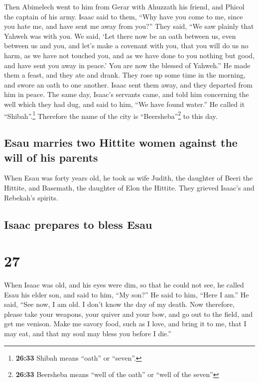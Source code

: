  Then Abimelech went to him from Gerar with Ahuzzath his
friend, and Phicol the captain of his army.  Isaac said
to them, ``Why have you come to me, since you hate me, and have sent me
away from you?''  They said, ``We saw plainly that Yahweh
was with you. We said, `Let there now be an oath between us, even
between us and you, and let's make a covenant with you, 
that you will do us no harm, as we have not touched you, and as we have
done to you nothing but good, and have sent you away in peace.' You are
now the blessed of Yahweh.''  He made them a feast, and
they ate and drank.  They rose up some time in the
morning, and swore an oath to one another. Isaac sent them away, and
they departed from him in peace.  The same day, Isaac's
servants came, and told him concerning the well which they had dug, and
said to him, ``We have found water.''  He called it
``Shibah''.\footnote{\textbf{26:33} Shibah means ``oath'' or ``seven''.}
Therefore the name of the city is ``Beersheba''\footnote{\textbf{26:33}
  Beersheba means ``well of the oath'' or ``well of the seven''} to this
day.

\hypertarget{esau-marries-two-hittite-women-against-the-will-of-his-parents}{%
\subsection{Esau marries two Hittite women against the will of his
parents}\label{esau-marries-two-hittite-women-against-the-will-of-his-parents}}

 When Esau was forty years old, he took as wife Judith,
the daughter of Beeri the Hittite, and Basemath, the daughter of Elon
the Hittite.  They grieved Isaac's and Rebekah's spirits.

\hypertarget{isaac-prepares-to-bless-esau}{%
\subsection{Isaac prepares to bless
Esau}\label{isaac-prepares-to-bless-esau}}

\hypertarget{section-26}{%
\section{27}\label{section-26}}

 When Isaac was old, and his eyes were dim, so that he
could not see, he called Esau his elder son, and said to him, ``My
son?'' He said to him, ``Here I am.''  He said, ``See now,
I am old. I don't know the day of my death.  Now
therefore, please take your weapons, your quiver and your bow, and go
out to the field, and get me venison.  Make me savory
food, such as I love, and bring it to me, that I may eat, and that my
soul may bless you before I die.''

